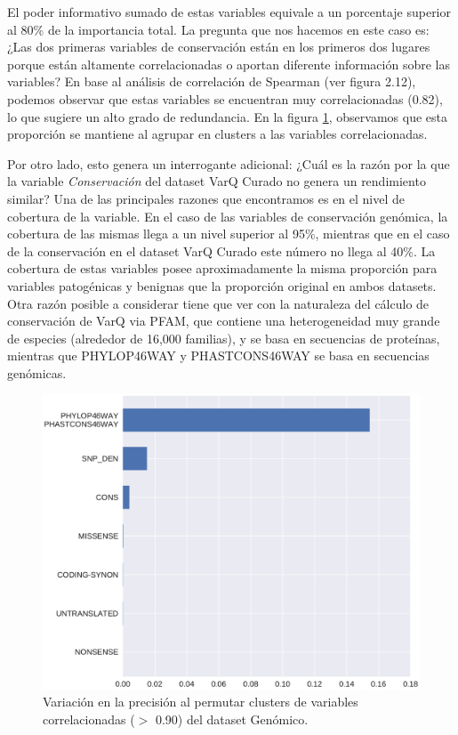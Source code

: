 El poder informativo sumado de estas variables equivale a un porcentaje superior al 80\% de la importancia total. La pregunta que nos hacemos en este caso es: ¿Las dos primeras variables de conservación están en los primeros dos lugares porque están altamente correlacionadas o aportan diferente información sobre las variables? En base al análisis de correlación de Spearman (ver figura 2.12), podemos observar que estas variables se encuentran muy correlacionadas (0.82), lo que sugiere un alto grado de redundancia. En la figura \ref{fig:importance_genomic_cluster}, observamos que esta proporción se mantiene al agrupar en clusters a las variables correlacionadas.

Por otro lado, esto genera un interrogante adicional: ¿Cuál es la razón por la que la variable \textit{Conservación} del dataset VarQ Curado no genera un rendimiento similar? Una de las principales razones que encontramos es en el nivel de cobertura de la variable. En el caso de las variables de conservación genómica, la cobertura de las mismas llega a un nivel superior al 95\%, mientras que en el caso de la conservación en el dataset VarQ Curado este número no llega al 40\%. La cobertura de estas variables posee aproximadamente la misma proporción para variables patogénicas y benignas que la proporción original en ambos datasets. Otra razón posible a considerar tiene que ver con la naturaleza del cálculo de conservación de VarQ via PFAM, que contiene una heterogeneidad muy grande de especies (alrededor de 16,000 familias), y se basa en secuencias de proteínas, mientras que PHYLOP46WAY y PHASTCONS46WAY se basa en secuencias genómicas.

\begin{figure}[H]
    \centering
    \includegraphics[scale=0.7]{documents/latex/figures/3/genomic/genomic_importance_cluster.pdf}
    \caption{Variación en la precisión al permutar clusters de variables correlacionadas ($>$ 0.90) del dataset Genómico.}
    \label{fig:importance_genomic_cluster}
\end{figure}


